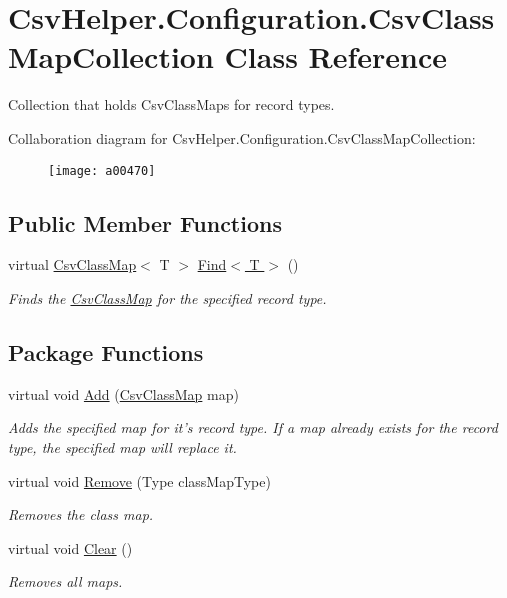 \hypertarget{a00056}{\section{Csv\-Helper.\-Configuration.\-Csv\-Class\-Map\-Collection Class Reference}
\label{a00056}
}


Collection that holds Csv\-Class\-Maps for record types.  




Collaboration diagram for Csv\-Helper.\-Configuration.\-Csv\-Class\-Map\-Collection\-:
\nopagebreak
\begin{figure}[H]
\begin{center}
\leavevmode
\texttt{[image: a00470]}
\end{center}
\end{figure}
\subsection*{Public Member Functions}
\begin{DoxyCompactItemize}
\item 
virtual \hyperlink{a00054}{Csv\-Class\-Map}$<$ T $>$ \hyperlink{a00056_ac75513617b6c256c3d693adf4482e1ed}{Find$<$ T $>$} ()
\begin{DoxyCompactList}\small\item\em Finds the \hyperlink{a00054}{Csv\-Class\-Map} for the specified record type. \end{DoxyCompactList}\end{DoxyCompactItemize}
\subsection*{Package Functions}
\begin{DoxyCompactItemize}
\item 
virtual void \hyperlink{a00056_aab6a14a4c1a614fac511ddd6af2c9e40}{Add} (\hyperlink{a00054}{Csv\-Class\-Map} map)
\begin{DoxyCompactList}\small\item\em Adds the specified map for it's record type. If a map already exists for the record type, the specified map will replace it. \end{DoxyCompactList}\item 
virtual void \hyperlink{a00056_a0b18f7ab62839aa354021986e5a2ef96}{Remove} (Type class\-Map\-Type)
\begin{DoxyCompactList}\small\item\em Removes the class map. \end{DoxyCompactList}\item 
virtual void \hyperlink{a00056_a91718f9b6527a7f833393d24587716cc}{Clear} ()
\begin{DoxyCompactList}\small\item\em Removes all maps. \end{DoxyCompactList}\end{DoxyCompactItemize}
